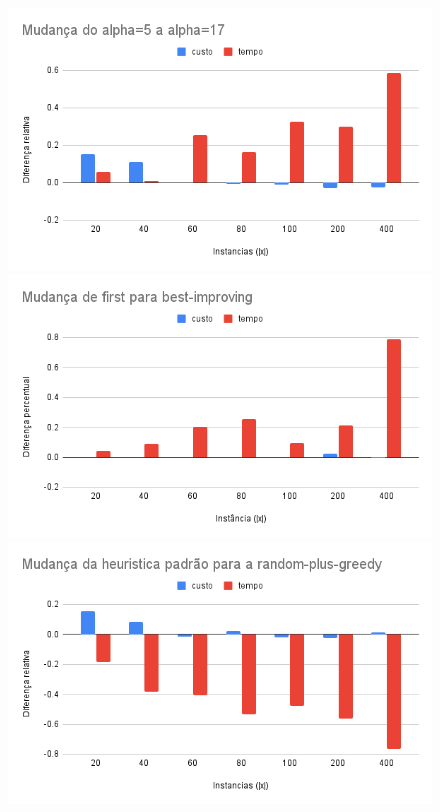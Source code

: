 \documentclass[11pt]{article}
\begin{document}
\begin{figure}
\begin{multicols}{2}
    \includegraphics[width=\linewidth]{alpha17.png}\par
    \includegraphics[width=\linewidth]{best.png}\par
    \end{multicols}
\begin{multicols}{2}
    \includegraphics[width=\linewidth]{random-plus.png}\par

\end{multicols}
\end{figure}
\end{document}
